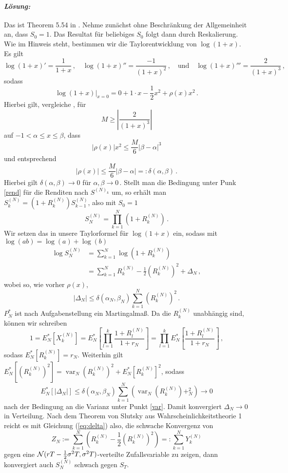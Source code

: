 \documentclass{article}
\begin{document}
\paragraph{\textnormal{\textit{Lösung:}}}
Das ist Theorem 5.54 in \cite{foellmer2016}.
Nehme zunächst ohne Beschränkung der Allgemeinheit an, dass $S_0=1$.
Das Resultat für beliebiges $S_0$ folgt dann durch Reskalierung.
Wie im Hinweis steht, bestimmen wir die Taylorentwicklung von $\log(1+x)$.
Es gilt
\[
  \log(1+x)'=\frac{1}{1+x}\,,\quad\log(1+x)''=\frac{-1}{(1+x)^2}\,,\quad\text{und}\quad\log(1+x)'''=\frac{2}{(1+x)^3}\,,
\]
sodass
\[
  \log(1+x)\Big|_{x=0}=0+1\cdot x-\frac{1}{2}x^2+\rho(x)x^2\,.
\]
Hierbei gilt, vergleiche \cite{enwiki:1254088858}, für
\[M\geq\left|\frac{2}{(1+x)^3}\right|\]
auf $-1<\alpha\leq x\leq \beta$, dass
\[
|\rho(x)|x^2\leq \frac{M}{6}|\beta-\alpha|^3
\]
und entsprechend
\[
  |\rho(x)|\leq\frac{M}{6}|\beta-\alpha|=:\delta(\alpha,\beta)\,.
\]
Hierbei gilt $\delta(\alpha,\beta)\to0$ für $\alpha,\beta\to0$\,.
Stellt man die Bedingung unter Punk \ref{rend} für die Renditen nach $S^{(N)_k}$ um, so erhält man $S^{(N)}_k=(1+R^{(N)}_k)S^{(N)}_{k-1}$, also mit $S_0=1$
\[
S^{(N)}_N=\prod_{k=1}^N(1+R^{(N)}_k)\,.
\]
Wir setzen das in unsere Taylorformel für $\log(1+x)$ ein, sodass mit $\log(ab)=\log(a)+\log(b)$
\begin{align}
  \log S^{(N)}_N
  &=\sum_{k=1}^N\log(1+R_k^{(N)})\\
  &=\sum_{k=1}^NR^{(N)}_k-\frac{1}{2}(R^{(N)}_k)^2+\Delta_N\,,\label{eq:delta}
\end{align}
wobei so, wie vorher $\rho(x)$,
\[
|\Delta_N|\leq\delta(\alpha_N,\beta_N)\sum_{k=1}^N(R^{(N)}_k)^2\,.
\]
$P^*_N$ ist nach Aufgabenstellung ein Martingalmaß.
Da die $R^{(N)}_k$ unabhängig sind, können wir schreiben
\[
  1=
  E^*_N[X^{(N)}_k]=E^*_N\left[\prod_{l=1}^k\frac{1+R^{(N)}_l}{1+r_N}\right]=\prod_{l=1}^kE^*_N\left[\frac{1+R^{(N)}_l}{1+r_N}\right]\,,
\]
sodass $E_N^*[R^{(N)}_k]=r_N$.
Weiterhin gilt $E_N^*[(R^{(N)}_k)^2]=\operatorname{var}_N(R^{(N)}_k)^2+E_N^*[R^{(N)}_k]^2$, sodass
\[
E_N^*[|\Delta_N|]\leq\delta(\alpha_N,\beta_N)\sum_{k=1}^N(\operatorname{var}_N(R^{(N)}_k)+_N^2)\to0
\]
nach der Bedingung an die Varianz unter Punkt \ref{var}.
Damit konvergiert $\Delta_N\to0$ in Verteilung.
Nach dem Theorem von Slutsky aus Wahrscheinlichkeitstheorie 1 reicht es mit Gleichung (\ref{eq:delta}) also, die schwache Konvergenz von
\[
Z_N:=\sum_{k=1}^N(R^{(N)}_k-\frac{1}{2}(R^{(N)}_k)^2)=:\sum_{k=1}^NY^{(N)}_k
\]
gegen eine ${\cal N}(rT-\frac{1}{2}\sigma^2T,\sigma^2T)$-verteilte Zufallsvariable zu zeigen, dann konvergiert auch $S^{(N)}_N$ schwach gegen $S_T$.
\end{document}
